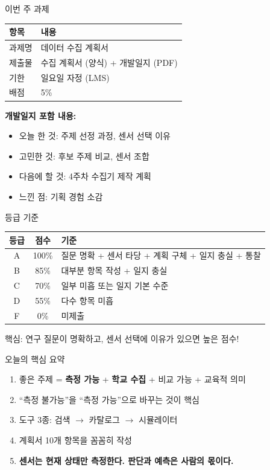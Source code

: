 \documentclass[10pt, aspectratio=169]{beamer}
\begin{document}
\begin{frame}{이번 주 과제}
\begin{center}
\begin{tabular}{ll}
\toprule
\textbf{항목} & \textbf{내용} \\
\midrule
과제명 & 데이터 수집 계획서 \\
제출물 & 수집 계획서 (양식) + 개발일지 (PDF) \\
기한 & 일요일 자정 (LMS) \\
배점 & 5\% \\
\bottomrule
\end{tabular}
\end{center}

\vspace{4mm}
\textbf{개발일지 포함 내용:}
\begin{itemize}
  \item 오늘 한 것: 주제 선정 과정, 센서 선택 이유
  \item 고민한 것: 후보 주제 비교, 센서 조합
  \item 다음에 할 것: 4주차 수집기 제작 계획
  \item 느낀 점: 기획 경험 소감
\end{itemize}
\end{frame}

\begin{frame}{등급 기준}
\begin{center}
\begin{tabular}{ccl}
\toprule
\textbf{등급} & \textbf{점수} & \textbf{기준} \\
\midrule
A & 100\% & 질문 명확 + 센서 타당 + 계획 구체 + 일지 충실 + 통찰 \\
B & 85\% & 대부분 항목 작성 + 일지 충실 \\
C & 70\% & 일부 미흡 또는 일지 기본 수준 \\
D & 55\% & 다수 항목 미흡 \\
F & 0\% & 미제출 \\
\bottomrule
\end{tabular}
\end{center}

\vfill
\begin{block}{}
핵심: 연구 질문이 명확하고, 센서 선택에 이유가 있으면 높은 점수!
\end{block}
\end{frame}

\begin{frame}{오늘의 핵심 요약}
\begin{enumerate}
  \item 좋은 주제 = \textbf{측정 가능} + \textbf{학교 수집} + 비교 가능 + 교육적 의미
  \item ``측정 불가능''을 ``측정 가능''으로 바꾸는 것이 핵심
  \item 도구 3종: 검색 $\rightarrow$ 카탈로그 $\rightarrow$ 시뮬레이터
  \item 계획서 10개 항목을 꼼꼼히 작성
  \item[\textbf{5.}] \textbf{센서는 현재 상태만 측정한다. 판단과 예측은 사람의 몫이다.}
\end{enumerate}
\end{frame}
\end{document}
